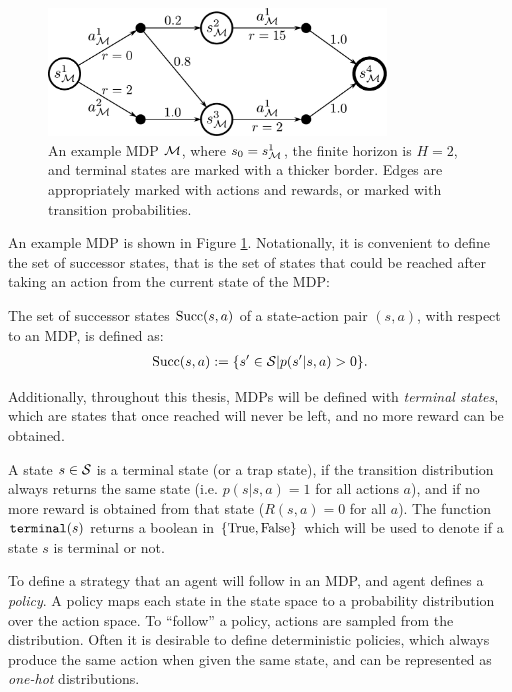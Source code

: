     \begin{figure}
        \centering\includegraphics[width=0.8\textwidth]{figures/ch2/example_mdp.pdf} 
        \caption[An example MDP $\cl{M}$.]{An example MDP $\cl{M}$, where $s_0=s_{\mathcal{M}}^1$, the finite horizon is $H=2$, and terminal states are marked with a thicker border. Edges are appropriately marked with actions and rewards, or marked with transition probabilities.}
        \label{fig:2:mdp_eg}
    \end{figure}

    An example MDP is shown in Figure \ref{fig:2:mdp_eg}. Notationally, it is convenient to define the set of successor states, that is the set of states that could be reached after taking an action from the current state of the MDP:
    \begin{defn}
        \label{def:2:succ}
        The set of \textnormal{successor states} ${\textnormal{Succ}(s,a)}$ of a state-action pair $(s,a)$, with respect to an MDP, is defined as: 
        \begin{align}
            {\textnormal{Succ}(s,a)}:=\{s'\in\mathcal{S}|p(s'|s,a)>0\}. \label{eq:2:succ_def}
        \end{align}
    \end{defn}

    Additionally, throughout this thesis, MDPs will be defined with \textit{terminal states}, which are states that once reached will never be left, and no more reward can be obtained. 
    \begin{defn}
        \label{def:2:terminal}
        A state $s\in\mathcal{S}$ is a \textnormal{terminal} state (or a \textnormal{trap} state), if the transition distribution always returns the same state (i.e. $p(s|s,a)=1$ for all actions $a$), and if no more reward is obtained from that state ($R(s,a)=0$ for all $a$). The function ${\textnormal{\texttt{terminal}}}(s)$ returns a boolean in $\{\textnormal{True},\textnormal{False}\}$ which will be used to denote if a state $s$ is terminal or not.
    \end{defn}

    To define a strategy that an agent will follow in an MDP, and agent defines a \textit{policy}. A policy maps each state in the state space to a probability distribution over the action space. To ``follow'' a policy, actions are sampled from the distribution. Often it is desirable to define deterministic policies, which always produce the same action when given the same state, and can be represented as \textit{one-hot} distributions. 


